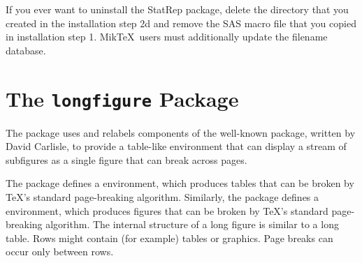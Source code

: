 \documentclass[article,oneside]{memoir}
\newcommand*{\StatRep}{\textsf{StatRep}\xspace}
\begin{document}
If you ever want to uninstall the \StatRep package,
delete the  directory that you created
in the installation step 2d and remove the SAS macro file 
that you copied in installation step 1.
   Mik\TeX\ users must additionally update the filename database.\\

\chapter{The \texttt{longfigure} Package}\label{longfigure}


    The  package uses and relabels components of the
    well-known  package, written by David Carlisle, to
    provide a table-like environment that can display a stream
    of subfigures as a single figure that can break across pages.

    The  package defines a  environment,
    which produces tables that can be broken by \TeX's standard page-breaking algorithm.
    Similarly, the  package defines a  environment, which produces
    figures that can be broken by \TeX's standard page-breaking algorithm.
    The internal structure of a long figure is similar to a long table.
    Rows might contain (for example) tables or graphics. Page breaks
    can occur only between rows.
\end{document}
